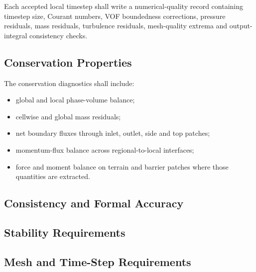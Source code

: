 
Each accepted local timestep shall write a numerical-quality record
containing timestep size, Courant numbers, VOF boundedness corrections,
pressure residuals, mass residuals, turbulence residuals, mesh-quality
extrema and output-integral consistency checks.

\subsection{Conservation Properties}
\label{sec:res-num-err-conservation-properties}


The conservation diagnostics shall include:

\begin{itemize}
  \item global and local phase-volume balance;
  \item cellwise and global mass residuals;
  \item net boundary fluxes through inlet, outlet, side and top
    patches;
  \item momentum-flux balance across regional-to-local interfaces;
  \item force and moment balance on terrain and barrier patches where
    those quantities are extracted.
\end{itemize}

\subsection{Consistency and Formal Accuracy}
\label{sec:res-num-err-consistency-formal-accuracy}


\subsection{Stability Requirements}
\label{sec:res-num-err-stability-requirements}


\subsection{Mesh and Time-Step Requirements}
\label{sec:res-num-err-mesh-time-step-requirements}

